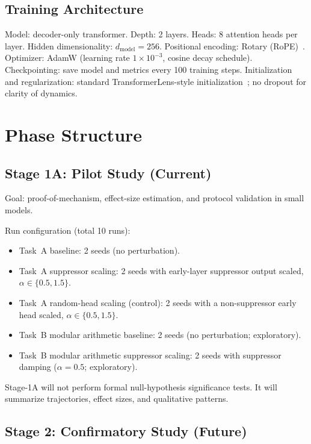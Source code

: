 \documentclass[11pt]{article}
\begin{document}
\subsection{Training Architecture}

Model: decoder-only transformer. Depth: 2 layers. Heads: 8 attention heads per layer. Hidden dimensionality: $d_{\text{model}} = 256$. Positional encoding: Rotary (RoPE)~\cite{su2021roformer}. Optimizer: AdamW (learning rate $1\times10^{-3}$, cosine decay schedule). Checkpointing: save model and metrics every 100 training steps. Initialization and regularization: standard TransformerLens-style initialization~\cite{nanda2022transformerlens}; no dropout for clarity of dynamics.

\section{Phase Structure}

\subsection{Stage 1A: Pilot Study (Current)}

Goal: proof-of-mechanism, effect-size estimation, and protocol validation in small models.

Run configuration (total 10 runs):
\begin{itemize}
  \item Task~A baseline: 2 seeds (no perturbation).
  \item Task~A suppressor scaling: 2 seeds with early-layer suppressor output scaled, $\alpha \in \{0.5, 1.5\}$.
  \item Task~A random-head scaling (control): 2 seeds with a non-suppressor early head scaled, $\alpha \in \{0.5, 1.5\}$.
  \item Task~B modular arithmetic baseline: 2 seeds (no perturbation; exploratory).
  \item Task~B modular arithmetic suppressor scaling: 2 seeds with suppressor damping ($\alpha = 0.5$; exploratory).
\end{itemize}

Stage-1A will not perform formal null-hypothesis significance tests. It will summarize trajectories, effect sizes, and qualitative patterns.

\subsection{Stage 2: Confirmatory Study (Future)}
\end{document}
